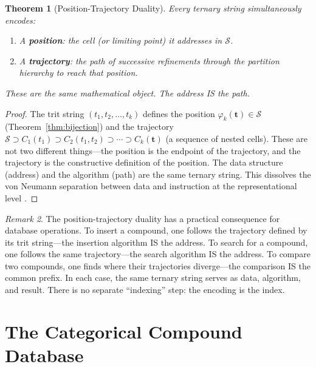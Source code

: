 \documentclass[11pt,twocolumn,a4paper]{article}
\newtheorem{theorem}{Theorem}[section]
\theoremstyle{definition}
\theoremstyle{remark}
\newtheorem{remark}[theorem]{Remark}
\newcommand{\Sspace}{\mathcal{S}}
\begin{document}
\begin{theorem}[Position-Trajectory Duality]
\label{thm:duality}
Every ternary string simultaneously encodes:
\begin{enumerate}[nosep]
\item A \textbf{position}: the cell (or limiting point) it addresses in $\Sspace$.
\item A \textbf{trajectory}: the path of successive refinements through the partition hierarchy to reach that position.
\end{enumerate}
These are the same mathematical object. The address IS the path.
\end{theorem}

\begin{proof}
The trit string $(t_1, t_2, \ldots, t_k)$ defines the position $\varphi_k(\mathbf{t}) \in \Sspace$ (Theorem~\ref{thm:bijection}) and the trajectory $\Sspace \supset C_1(t_1) \supset C_2(t_1, t_2) \supset \cdots \supset C_k(\mathbf{t})$ (a sequence of nested cells). These are not two different things---the position is the endpoint of the trajectory, and the trajectory is the constructive definition of the position. The data structure (address) and the algorithm (path) are the same ternary string. This dissolves the von Neumann separation between data and instruction at the representational level \citep{vonneumann1945}.
\end{proof}

\begin{remark}
The position-trajectory duality has a practical consequence for database operations. To insert a compound, one follows the trajectory defined by its trit string---the insertion algorithm IS the address. To search for a compound, one follows the same trajectory---the search algorithm IS the address. To compare two compounds, one finds where their trajectories diverge---the comparison IS the common prefix. In each case, the same ternary string serves as data, algorithm, and result. There is no separate ``indexing'' step: the encoding is the index.
\end{remark}




\part{The Categorical Compound Database}
\end{document}
